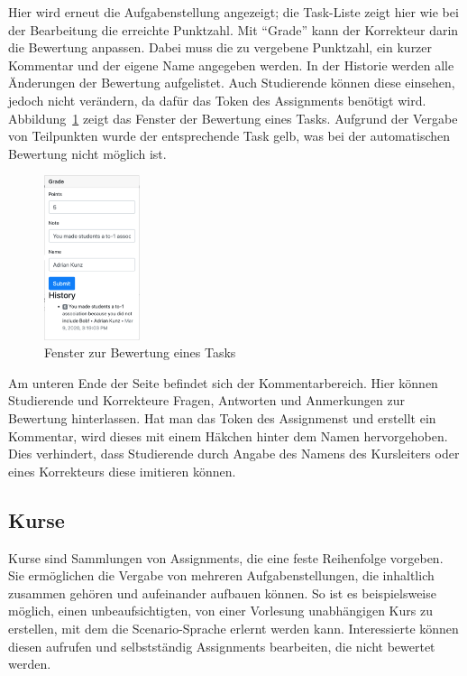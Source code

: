Hier wird erneut die Aufgabenstellung angezeigt;
die Task-Liste zeigt hier wie bei der Bearbeitung die erreichte Punktzahl.
Mit ``Grade'' kann der Korrekteur darin die Bewertung anpassen.
Dabei muss die zu vergebene Punktzahl, ein kurzer Kommentar und der eigene Name angegeben werden.
In der Historie werden alle Änderungen der Bewertung aufgelistet.
Auch Studierende können diese einsehen, jedoch nicht verändern, da dafür das Token des Assignments benötigt wird.
Abbildung~\ref{fig:grade-popover} zeigt das Fenster der Bewertung eines Tasks.
Aufgrund der Vergabe von Teilpunkten wurde der entsprechende Task gelb, was bei der automatischen Bewertung nicht möglich ist.

\begin{figure}
    \centering
    \includegraphics[width=0.25\textwidth]{chapter/fulib.org/img/grade-popover.png}
    \caption{Fenster zur Bewertung eines Tasks}
    \label{fig:grade-popover}
\end{figure}

Am unteren Ende der Seite befindet sich der Kommentarbereich.
Hier können Studierende und Korrekteure Fragen, Antworten und Anmerkungen zur Bewertung hinterlassen.
Hat man das Token des Assignmenst und erstellt ein Kommentar,
wird dieses mit einem Häkchen hinter dem Namen hervorgehoben.
Dies verhindert, dass Studierende durch Angabe des Namens des Kursleiters oder eines Korrekteurs diese imitieren können.

\subsection{Kurse}\label{subsec:courses}

Kurse sind Sammlungen von Assignments, die eine feste Reihenfolge vorgeben.
Sie ermöglichen die Vergabe von mehreren Aufgabenstellungen, die inhaltlich zusammen gehören und aufeinander aufbauen können.
So ist es beispielsweise möglich, einen unbeaufsichtigten, von einer Vorlesung unabhängigen Kurs zu erstellen, mit dem die Scenario-Sprache erlernt werden kann.
Interessierte können diesen aufrufen und selbstständig Assignments bearbeiten, die nicht bewertet werden.

